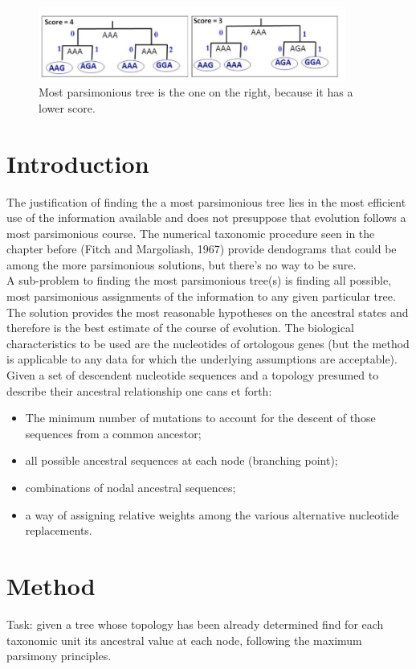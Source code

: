 \begin{figure}[H]
		\centering
		\includegraphics[width=0.9\textwidth]{1.png}
		\caption{Most parsimonious tree is the one on the right, because it has a lower score. }
		\label{fig:intro}
	\end{figure}

\section{Introduction}
The justification of finding the a most parsimonious tree lies in the most efficient use of the information available and does not presuppose that evolution follows a most parsimonious course. The numerical taxonomic procedure seen in the chapter before (Fitch and Margoliash, 1967) provide dendograms that could be among the more parsimonious solutions, but there's no way to be sure.
\\
A sub-problem to finding the most parsimonious tree(s) is finding all possible, most parsimonious assignments of the information to any given particular tree. The solution provides the most reasonable hypotheses on the ancestral states and therefore is the best estimate of the course of evolution.
The biological characteristics to be used are the nucleotides of ortologous genes (but the method is applicable to any data for which the underlying assumptions are acceptable).
\\
Given a set of descendent nucleotide sequences and a topology presumed to describe their ancestral relationship one cans et forth:

\begin{itemize}
\item The minimum number of mutations to account for the descent of those sequences from a common ancestor;
\item all possible ancestral sequences at each node (branching point);
\item combinations of nodal ancestral sequences;
\item a way of assigning relative weights among the various alternative nucleotide replacements.
\end{itemize}

\section{Method}
Task: given a tree whose topology has been already determined find for each taxonomic unit its ancestral value at each node, following the maximum parsimony principles.
